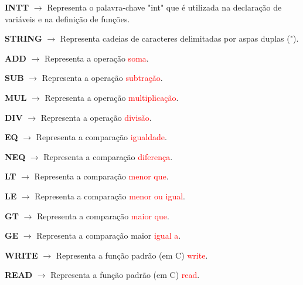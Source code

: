\documentclass[12pt,a4paper]{report}
\begin{document}
    \hspace{3cm}
    \textbf{INTT} $\rightarrow$ Representa o palavra-chave "int" que é utilizada na declaração de variáveis e na definição de funções.

    \hspace{3cm}
    \textbf{STRING} $\rightarrow$ Representa cadeias de caracteres delimitadas por aspas duplas (").

    \hspace{3cm}
    \textbf{ADD} $\rightarrow$ Representa a operação \textcolor{red}{soma}.

    \hspace{3cm}
    \textbf{SUB} $\rightarrow$ Representa a operação \textcolor{red}{subtração}.

    \hspace{3cm}
    \textbf{MUL} $\rightarrow$ Representa a operação \textcolor{red}{multiplicação}.

    \hspace{3cm}
    \textbf{DIV} $\rightarrow$ Representa a operação \textcolor{red}{divisão}.

    \hspace{3cm}
    \textbf{EQ} $\rightarrow$ Representa a comparação \textcolor{red}{igualdade}.

    \hspace{3cm}
    \textbf{NEQ} $\rightarrow$ Representa a comparação \textcolor{red}{diferença}.

    \hspace{3cm}
    \textbf{LT} $\rightarrow$ Representa a comparação \textcolor{red}{menor que}.

    \hspace{3cm}
    \textbf{LE} $\rightarrow$ Representa a comparação \textcolor{red}{menor ou igual}.

    \hspace{3cm}
    \textbf{GT} $\rightarrow$ Representa a comparação \textcolor{red}{maior que}.

    \hspace{3cm}
    \textbf{GE} $\rightarrow$ Representa a comparação maior \textcolor{red}{igual a}.

    \hspace{3cm}
    \textbf{WRITE} $\rightarrow$ Representa a função padrão (em C) \textcolor{red}{write}.

    \hspace{3cm}
    \textbf{READ} $\rightarrow$ Representa a função padrão (em C) \textcolor{red}{read}.
\end{document}
